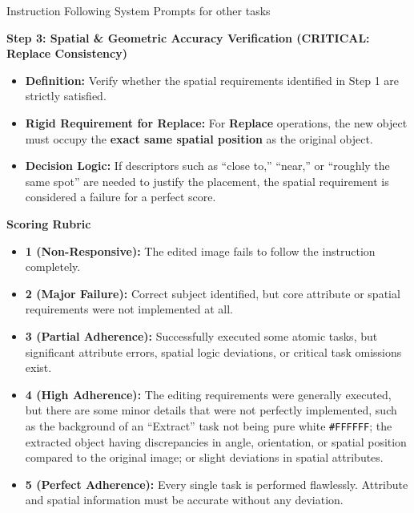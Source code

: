 \begin{promptbox}[label={System Prompts: IF_other tasks}]{Instruction Following System Prompts for other tasks}
\medskip

\textbf{Step 3: Spatial \& Geometric Accuracy Verification (CRITICAL: Replace Consistency)}

\begin{itemize}[leftmargin=2.2em, labelsep=0.4em, itemsep=2pt]
    \item \textbf{Definition:} Verify whether the spatial requirements identified in Step 1 are strictly satisfied.
    
    \item \textbf{Rigid Requirement for Replace:} For \textbf{Replace} operations, the new object must occupy the \textbf{exact same spatial position} as the original object.
    
    \item \textbf{Decision Logic:} If descriptors such as ``close to,'' ``near,'' or ``roughly the same spot'' are needed to justify the placement, the spatial requirement is considered a failure for a perfect score.
\end{itemize}

\medskip

\textbf{Scoring Rubric}

\begin{itemize}[leftmargin=2.2em, labelsep=0.4em, itemsep=2pt]
    \item \textbf{1 (Non-Responsive):} The edited image fails to follow the instruction completely.
    
    \item \textbf{2 (Major Failure):} Correct subject identified, but core attribute or spatial requirements were not implemented at all.
    
    \item \textbf{3 (Partial Adherence):} Successfully executed some atomic tasks, but significant attribute errors, spatial logic deviations, or critical task omissions exist.
    
    \item \textbf{4 (High Adherence):} The editing requirements were generally executed, but there are some minor details that were not perfectly implemented, such as the background of an ``Extract'' task not being pure white \texttt{\#FFFFFF}; the extracted object having discrepancies in angle, orientation, or spatial position compared to the original image; or slight deviations in spatial attributes.
    
    \item \textbf{5 (Perfect Adherence):} Every single task is performed flawlessly. Attribute and spatial information must be accurate without any deviation.
\end{itemize}


\end{promptbox}
